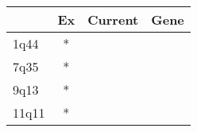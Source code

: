 \begin{tabular}{lccr}
\toprule
{} & Ex & Current & Gene \\
\midrule
1q44  &  * &         &      \\
7q35  &  * &         &      \\
9q13  &  * &         &      \\
11q11 &  * &         &      \\
\bottomrule
\end{tabular}
